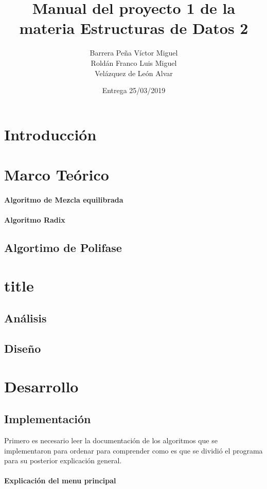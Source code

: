 \documentclass{article}
\title{Manual del proyecto 1 de la materia Estructuras de Datos 2}
\author{Barrera Peña Víctor Miguel \\
		Roldán Franco Luis Miguel \\
		Velázquez de León Alvar 
	 }
\date{Entrega 25/03/2019}
\begin{document}
	\maketitle
	\section{Introducción}
	\section{Marco Teórico}
		\paragraph{Algoritmo de Mezcla equilibrada}
		\paragraph{Algoritmo Radix}
		\subsection{Algortimo de Polifase}
		
		\section{title}
	\subsection{Análisis}
	\subsection{Diseño}
	\section{Desarrollo}
		
	\subsection{Implementación}
		Primero es necesario leer la documentación de los algoritmos que se implementaron para ordenar  para comprender como es que se dividió el programa para su posterior explicación general.
		
	
	\paragraph*{Explicación del menu principal}
	
\end{document}
